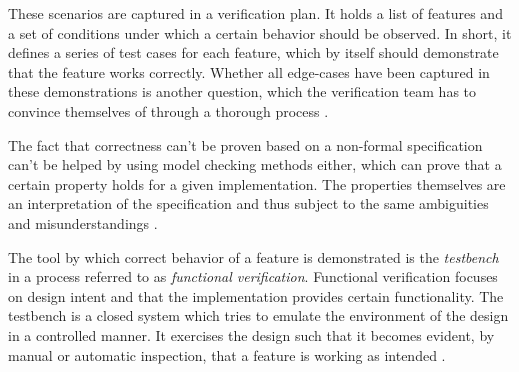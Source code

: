 \documentclass[12pt]{report}
\begin{document}
These scenarios are captured in a verification plan. It holds a list of features and a set of conditions under which
a certain behavior should be observed. In short, it defines a series of test cases for each feature, which by itself
should demonstrate that the feature works correctly. Whether all edge-cases have been captured in these
demonstrations is another question, which the verification team has to convince themselves of through a thorough
process \cite[Ch. 1]{bergeron2012writing}.

The fact that correctness can't be proven based on a non-formal specification can't be helped by using model checking
methods either, which can prove that a certain property holds for a given implementation. The properties themselves
are an interpretation of the specification and thus subject to the same ambiguities and misunderstandings \cite[Ch.
1]{bergeron2012writing}.

The tool by which correct behavior of a feature is demonstrated is the \textit{testbench} in a process referred to as
\textit{functional verification}. Functional verification focuses on design intent and that the implementation
provides certain functionality. The testbench is a closed system which tries to emulate the environment of the design
in a controlled manner. It exercises the design such that it becomes evident, by manual or automatic inspection, that
a feature is working as intended \cite[Ch. 1]{bergeron2012writing}.
\end{document}
